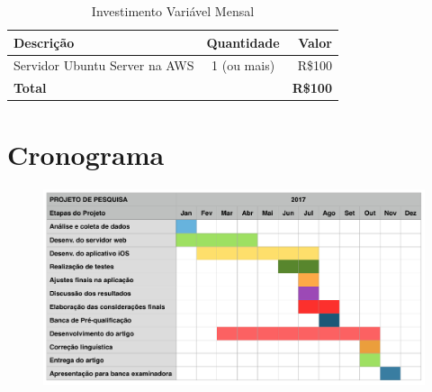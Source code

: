 \documentclass[
	12pt,
	oneside,
	a4paper,
	english,
	brazil,
]{abntex2}
\begin{document}
\begin{table}[ht]
\caption{Investimento Variável Mensal}
\begin{tabular}{lcr}
\hline\hline
Descrição & Quantidade &Valor \\ [0.5ex]
\hline
Servidor Ubuntu Server na AWS &1 (ou mais)&R\$100 \\
\hline
\textbf{Total}&&\textbf{R\$100} \\ [1ex]
\end{tabular}
\label{table:nonlin}
\end{table}



\chapter{Cronograma}

\begin{figure}[h]
\centering
\includegraphics[width=1.0\textwidth]{cronograma}
\end{figure}


\postextual



%
%
\end{document}
